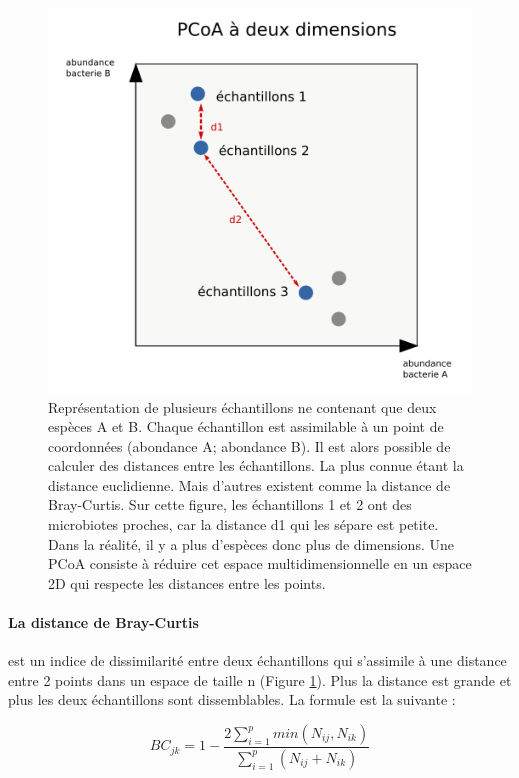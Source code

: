 \documentclass[12pt,a4paper]{article}
\begin{document}
\begin{figure}[!h]
\begin{center}
\includegraphics[scale=0.6]{img/pcoatuto.png}\hfill
\end{center}
\caption{Représentation de plusieurs échantillons ne contenant que deux espèces A et B. Chaque échantillon est assimilable à un point de coordonnées (abondance A; abondance B). Il est alors possible de calculer des distances entre les échantillons. La plus connue étant la distance euclidienne. Mais d'autres existent comme la distance de Bray-Curtis. Sur cette figure, les échantillons 1 et 2 ont des microbiotes proches, car la distance d1 qui les sépare est petite. Dans la réalité, il y a plus d'espèces donc plus de dimensions. Une PCoA consiste à réduire cet espace multidimensionnelle en un espace 2D qui respecte les distances entre les points. }
\label{pcoatuto}
\end{figure}
\newpage

\paragraph{La distance de Bray-Curtis} est un indice de dissimilarité entre deux échantillons qui s'assimile à une distance entre 2 points dans un espace de taille n (Figure \ref{pcoatuto}). Plus la distance est grande et plus les deux échantillons sont dissemblables. La formule est la suivante :

\begin{mycapequ}[!h]
   \begin{equation}
    BC_{jk} = 1 - \frac{2\sum_{i=1}^{p}min(N_{ij},N_{ik})}{\sum_{i=1}^{p}(N_{ij} + N_{ik})}
   \end{equation}
      \caption{Où $N_{ij}$ est l'abondance d'une  espèce i dans l'échantillon j et $N_{ik}$ l'abondance de la même espèce i dans l'échantillon k. Le terme min(.,.) correspond au minimum obtenu pour deux comptes sur les mêmes échantillons. Les sommes situées au numérateur et dénominateur sont réalisées sur l'ensemble des espèces présentes dans les échantillons.}
\end{mycapequ}
\end{document}
